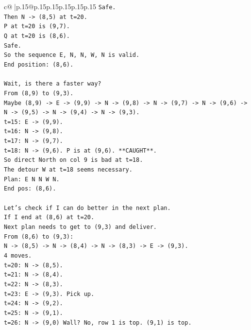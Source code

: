 \documentclass{article}
\begin{document}
{\begin{supertabular}{c@{$\;$}|p{.15\linewidth}@{}p{.15\linewidth}p{.15\linewidth}p{.15\linewidth}p{.15\linewidth}p{.15\linewidth}}
{{{\texttt{Safe.} \\
\texttt{Then N {-}> (8,5) at t=20.} \\
\texttt{P at t=20 is (9,7).} \\
\texttt{Q at t=20 is (8,6).} \\
\texttt{Safe.} \\
\texttt{So the sequence E, N, N, W, N is valid.} \\
\texttt{End position: (8,6).} \\
\\ 
\texttt{Wait, is there a faster way?} \\
\texttt{From (8,9) to (9,3).} \\
\texttt{Maybe (8,9) {-}> E {-}> (9,9) {-}> N {-}> (9,8) {-}> N {-}> (9,7) {-}> N {-}> (9,6) {-}> N {-}> (9,5) {-}> N {-}> (9,4) {-}> N {-}> (9,3).} \\
\texttt{t=15: E {-}> (9,9).} \\
\texttt{t=16: N {-}> (9,8).} \\
\texttt{t=17: N {-}> (9,7).} \\
\texttt{t=18: N {-}> (9,6). P is at (9,6). **CAUGHT**.} \\
\texttt{So direct North on col 9 is bad at t=18.} \\
\texttt{The detour W at t=18 seems necessary.} \\
\texttt{Plan: E N N W N.} \\
\texttt{End pos: (8,6).} \\
\\ 
\texttt{Let's check if I can do better in the next plan.} \\
\texttt{If I end at (8,6) at t=20.} \\
\texttt{Next plan needs to get to (9,3) and deliver.} \\
\texttt{From (8,6) to (9,3):} \\
\texttt{N {-}> (8,5) {-}> N {-}> (8,4) {-}> N {-}> (8,3) {-}> E {-}> (9,3).} \\
\texttt{4 moves.} \\
\texttt{t=20: N {-}> (8,5).} \\
\texttt{t=21: N {-}> (8,4).} \\
\texttt{t=22: N {-}> (8,3).} \\
\texttt{t=23: E {-}> (9,3). Pick up.} \\
\texttt{t=24: N {-}> (9,2).} \\
\texttt{t=25: N {-}> (9,1).} \\
\texttt{t=26: N {-}> (9,0) Wall? No, row 1 is top. (9,1) is top.} \\
}}}
\end{supertabular}}
\end{document}
